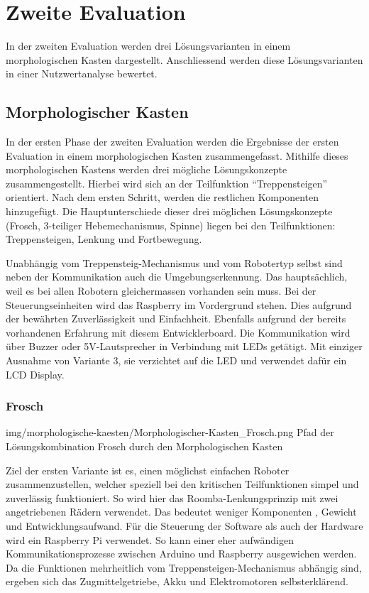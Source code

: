 \newpage
\section{Zweite Evaluation}
In der zweiten Evaluation werden drei Lösungsvarianten in einem morphologischen Kasten dargestellt. Anschliessend werden diese Lösungsvarianten in einer Nutzwertanalyse bewertet.
\subsection{Morphologischer Kasten}
In der ersten Phase der zweiten Evaluation werden die Ergebnisse der ersten Evaluation in einem morphologischen Kasten zusammengefasst. Mithilfe dieses morphologischen Kastens werden drei mögliche Lösungskonzepte zusammengestellt. Hierbei wird sich an der Teilfunktion ``Treppensteigen'' orientiert. Nach dem ersten Schritt, werden die restlichen Komponenten hinzugefügt. Die Hauptunterschiede dieser drei möglichen Lösungskonzepte (Frosch, 3-teiliger Hebemechanismus, Spinne) liegen bei den Teilfunktionen: Treppensteigen, Lenkung und Fortbewegung.

Unabhängig vom Treppensteig-Mechanismus und vom Robotertyp selbst sind neben der Kommunikation auch die Umgebungserkennung. Das hauptsächlich, weil es bei allen Robotern gleichermassen vorhanden sein muss. Bei der Steuerungseinheiten wird das Raspberry im Vordergrund stehen. Dies aufgrund der bewährten Zuverlässigkeit und Einfachheit. Ebenfalls aufgrund der bereits vorhandenen Erfahrung mit diesem Entwicklerboard. Die Kommunikation wird über Buzzer oder 5V-Lautsprecher in Verbindung mit LEDs getätigt. Mit einziger Ausnahme von Variante 3, sie verzichtet auf die LED und verwendet dafür ein LCD Display.

\subsubsection{Frosch}
\image
   {img/morphologische-kaesten/Morphologischer-Kasten_Frosch.png}
   {Pfad der Lösungskombination Frosch durch den Morphologischen Kasten}
   
Ziel der ersten Variante ist es, einen möglichst einfachen Roboter zusammenzustellen, welcher speziell bei den kritischen Teilfunktionen simpel und zuverlässig funktioniert. So wird hier das Roomba-Lenkungsprinzip mit zwei angetriebenen Rädern verwendet. Das bedeutet weniger Komponenten , Gewicht und Entwicklungsaufwand. 
Für die  Steuerung der Software als auch der Hardware wird ein Raspberry Pi verwendet. So kann einer eher aufwändigen Kommunikationsprozesse zwischen Arduino und Raspberry ausgewichen werden. 
Da die Funktionen mehrheitlich vom Treppensteigen-Mechanismus abhängig sind, ergeben sich das Zugmittelgetriebe, Akku und Elektromotoren selbsterklärend. 


